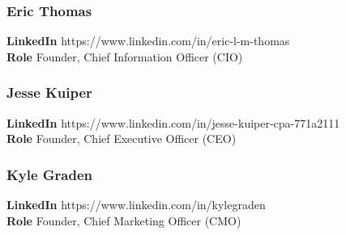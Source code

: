 \documentclass[11pt]{article}
\begin{document}
\subsubsection{Eric Thomas}
\begin{minipage}{\textwidth}
\textbf{LinkedIn} https://www.linkedin.com/in/eric-l-m-thomas\\
\textbf{Role} Founder, Chief Information Officer (CIO)\\
\end{minipage}

\subsubsection{Jesse Kuiper}
\begin{minipage}{\textwidth}
\textbf{LinkedIn} https://www.linkedin.com/in/jesse-kuiper-cpa-771a2111\\
\textbf{Role} Founder, Chief Executive Officer (CEO)\\
\end{minipage}

\subsubsection{Kyle Graden}
\begin{minipage}{\textwidth}
\textbf{LinkedIn} https://www.linkedin.com/in/kylegraden\\
\textbf{Role} Founder, Chief Marketing Officer (CMO)\\
\end{minipage}

\pagebreak

\printbibliography

\vspace*{\fill}

\begin{flushright}

\pdfcreationdate
\end{flushright}
\end{document}
